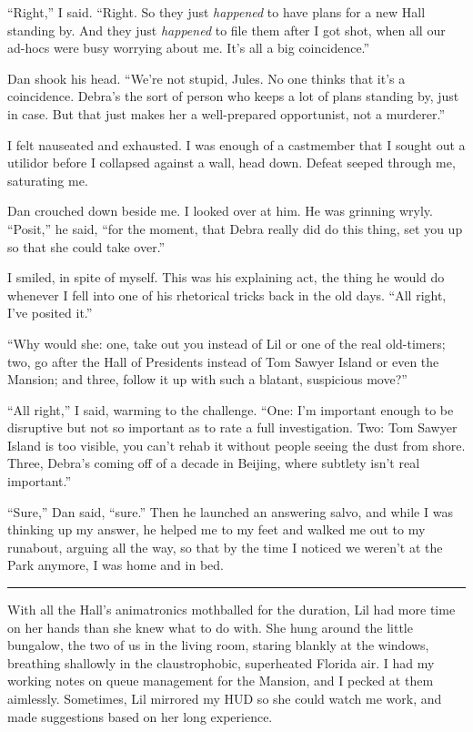 “Right,” I said. “Right. So they just \emph{happened} to have plans
for a new Hall standing by. And they just \emph{happened} to file
them after I got shot, when all our ad-hocs were busy worrying
about me. It's all a big coincidence.”

Dan shook his head. “We're not stupid, Jules. No one thinks that
it's a coincidence. Debra's the sort of person who keeps a lot of
plans standing by, just in case. But that just makes her a
well-prepared opportunist, not a murderer.”

I felt nauseated and exhausted. I was enough of a castmember that I
sought out a utilidor before I collapsed against a wall, head down.
Defeat seeped through me, saturating me.

Dan crouched down beside me. I looked over at him. He was grinning
wryly. “Posit,” he said, “for the moment, that Debra really did do
this thing, set you up so that she could take over.”

I smiled, in spite of myself. This was his explaining act, the
thing he would do whenever I fell into one of his rhetorical tricks
back in the old days. “All right, I've posited it.”

“Why would she: one, take out you instead of Lil or one of the real
old-timers; two, go after the Hall of Presidents instead of Tom
Sawyer Island or even the Mansion; and three, follow it up with
such a blatant, suspicious move?”

“All right,” I said, warming to the challenge. “One: I'm important
enough to be disruptive but not so important as to rate a full
investigation. Two: Tom Sawyer Island is too visible, you can't
rehab it without people seeing the dust from shore. Three, Debra's
coming off of a decade in Beijing, where subtlety isn't real
important.”

“Sure,” Dan said, “sure.” Then he launched an answering salvo, and
while I was thinking up my answer, he helped me to my feet and
walked me out to my runabout, arguing all the way, so that by the
time I noticed we weren't at the Park anymore, I was home and in
bed.

\begin{center}\rule{1in}{0.4pt}\end{center}

With all the Hall's animatronics mothballed for the duration, Lil
had more time on her hands than she knew what to do with. She hung
around the little bungalow, the two of us in the living room,
staring blankly at the windows, breathing shallowly in the
claustrophobic, superheated Florida air. I had my working notes on
queue management for the Mansion, and I pecked at them aimlessly.
Sometimes, Lil mirrored my HUD so she could watch me work, and made
suggestions based on her long experience.

